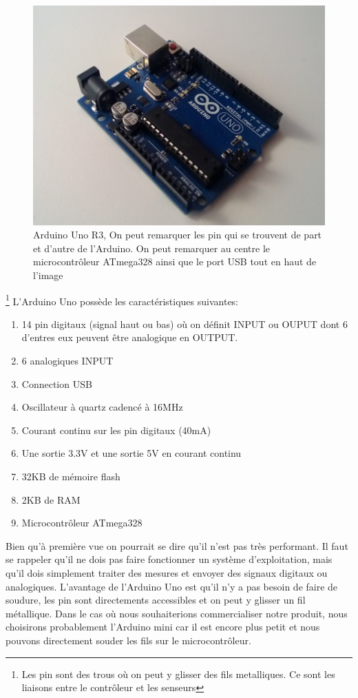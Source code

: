 \documentclass[a4paper,12pt]{report}
\begin{document}
{\begin{figure}[h]
\begin{center}
\includegraphics[scale=0.38]{arduino_uno.jpg}
\caption{Arduino Uno R3, On peut remarquer les pin  \label{pin} qui se trouvent de part et d'autre de l'Arduino. On peut remarquer au centre le microcontrôleur ATmega328 ainsi que le port USB tout en haut de l'image}
\end{center}
\end{figure}\footnote{Les pin sont des trous où on peut y glisser des fils metalliques. Ce sont les liaisons entre le contrôleur et les senseurs}
L'Arduino Uno possède les caractéristiques suivantes:
\begin{enumerate}
\item 14 pin digitaux (signal haut ou bas) où on définit INPUT ou OUPUT dont 6 d'entres eux peuvent être analogique en OUTPUT.
\item  6 analogiques INPUT
\item Connection USB
\item Oscillateur à quartz cadencé à 16MHz
\item Courant continu sur les pin digitaux (40mA)
\item Une sortie 3.3V et une sortie 5V en courant continu
\item 32KB de mémoire flash
\item 2KB de RAM
\item Microcontrôleur ATmega328
\end{enumerate}
Bien qu'à première vue on pourrait se dire qu'il n'est pas très performant. Il faut se rappeler qu'il ne dois pas faire fonctionner un système d'exploitation, mais qu'il dois simplement traiter des mesures et envoyer des signaux digitaux ou analogiques. L'avantage de l'Arduino Uno est qu'il n'y a pas besoin de faire de soudure, les pin sont directements accessibles et on peut y glisser un fil métallique. Dans le cas où nous souhaiterions commercialiser notre produit, nous choisirons probablement l'Arduino mini car il est encore plus petit et nous pouvons directement souder les fils sur le microcontrôleur.

}
\end{document}
